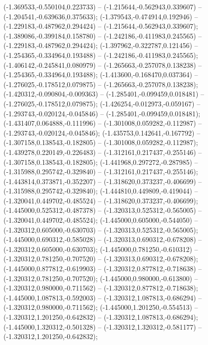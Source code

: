  (-1.369533,-0.550104,0.223733) -- (-1.215644,-0.562943,0.339607) -- (-1.204541,-0.639636,0.375633);
 (-1.379543,-0.474914,0.192946) -- (-1.229183,-0.487962,0.294424) -- (-1.215644,-0.562943,0.339607);
 (-1.389086,-0.399184,0.158780) -- (-1.242186,-0.411983,0.245565) -- (-1.229183,-0.487962,0.294424);
 (-1.397962,-0.322787,0.121456) -- (-1.254365,-0.334964,0.193488) -- (-1.242186,-0.411983,0.245565);
 (-1.406142,-0.245841,0.080979) -- (-1.265663,-0.257078,0.138238) -- (-1.254365,-0.334964,0.193488);
 (-1.413600,-0.168470,0.037364) -- (-1.276025,-0.178512,0.079875) -- (-1.265663,-0.257078,0.138238);
 (-1.420312,-0.090804,-0.009363) -- (-1.285401,-0.099459,0.018481) -- (-1.276025,-0.178512,0.079875);
 (-1.426254,-0.012973,-0.059167) -- (-1.293743,-0.020124,-0.045846) -- (-1.285401,-0.099459,0.018481);
 (-1.431407,0.064888,-0.111996) -- (-1.301008,0.059282,-0.112987) -- (-1.293743,-0.020124,-0.045846);
 (-1.435753,0.142641,-0.167792) -- (-1.307158,0.138543,-0.182805) -- (-1.301008,0.059282,-0.112987);
 (-1.439278,0.220149,-0.226483) -- (-1.312161,0.217437,-0.255146) -- (-1.307158,0.138543,-0.182805);
 (-1.441968,0.297272,-0.287985) -- (-1.315988,0.295742,-0.329840) -- (-1.312161,0.217437,-0.255146);
 (-1.443814,0.373871,-0.352207) -- (-1.318620,0.373237,-0.406699) -- (-1.315988,0.295742,-0.329840);
 (-1.444810,0.449809,-0.419044) -- (-1.320041,0.449702,-0.485524) -- (-1.318620,0.373237,-0.406699);
 (-1.445000,0.525312,-0.487378) -- (-1.320313,0.525312,-0.565005) -- (-1.320041,0.449702,-0.485524);
 (-1.445000,0.605000,-0.544050) -- (-1.320312,0.605000,-0.630703) -- (-1.320313,0.525312,-0.565005);
 (-1.445000,0.690312,-0.585028) -- (-1.320313,0.690312,-0.678208) -- (-1.320312,0.605000,-0.630703);
 (-1.445000,0.781250,-0.610312) -- (-1.320312,0.781250,-0.707520) -- (-1.320313,0.690312,-0.678208);
 (-1.445000,0.877812,-0.619903) -- (-1.320312,0.877812,-0.718638) -- (-1.320312,0.781250,-0.707520);
 (-1.445000,0.980000,-0.613800) -- (-1.320312,0.980000,-0.711562) -- (-1.320312,0.877812,-0.718638);
 (-1.445000,1.087813,-0.592003) -- (-1.320312,1.087813,-0.686294) -- (-1.320312,0.980000,-0.711562);
 (-1.445000,1.201250,-0.554513) -- (-1.320312,1.201250,-0.642832) -- (-1.320312,1.087813,-0.686294);
 (-1.445000,1.320312,-0.501328) -- (-1.320312,1.320312,-0.581177) -- (-1.320312,1.201250,-0.642832);

